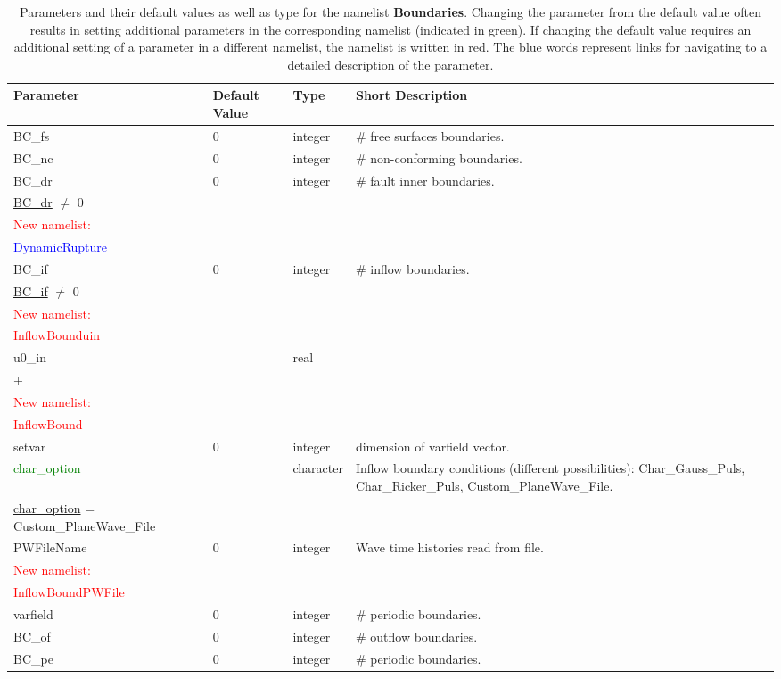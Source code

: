 \documentclass[12pt,twoside]{article}
\begin{document}
\newpage

\begin{table}[H]
\caption{Parameters and their default values as well as type for the namelist \textbf{Boundaries}.
         Changing the parameter from the default value often results in setting additional parameters
         in the corresponding namelist (indicated in green).
         If changing the default value requires an additional setting of a parameter in a different namelist,
         the namelist is written in red. The blue words represent
         links for navigating to a detailed description of the parameter.}
\begin{center}
\begin{tabular}{|p{4.5cm}|p{2.4cm}|p{2cm}|p{4cm}|}
\hline
Parameter & Default Value & Type & Short Description \\
\hline
BC\_fs & 0 & integer & \# free surfaces boundaries.\\
BC\_nc & 0 & integer & \# non-conforming boundaries.\\
BC\_dr & 0 & integer & \# fault inner boundaries.\\
\hdashline
\uline{BC\_dr} $\neq$ 0 & & &\\
\textcolor{red}{New namelist:} & & &\\
\hyperlink{dynrupture}{\textcolor{blue}{DynamicRupture}} & & &\\
\hline
BC\_if & 0 & integer & \# inflow boundaries.\\
\hdashline
\uline{BC\_if} $\neq$ 0 & & &\\
\textcolor{red}{New namelist:} & & &\\
\textcolor{red}{InflowBounduin} & & &\\
u0\_in &  & real & \\
\textbf{$+$} &  & & \\
\textcolor{red}{New namelist:} & & &\\
\textcolor{red}{InflowBound} & & &\\
setvar & 0 & integer & dimension of varfield vector.\\
\textcolor{green}{char\_option} &  & character & Inflow boundary conditions (different possibilities):
                              Char\_Gauss\_Puls, Char\_Ricker\_Puls, Custom\_PlaneWave\_File.\\
\hdashline
\uline{char\_option} = Custom\_PlaneWave\_File & & &\\
PWFileName & 0 & integer & Wave time histories read from file.\\
\textcolor{red}{New namelist:} & & &\\
\textcolor{red}{InflowBoundPWFile} & & &\\
varfield & 0 & integer & \# periodic boundaries.\\
\hline
BC\_of & 0 & integer & \# outflow boundaries.\\
BC\_pe & 0 & integer & \# periodic boundaries.\\
\hline
\end{tabular}
\end{center}
\label{bound-table}
\end{table}
\newpage
\end{document}
